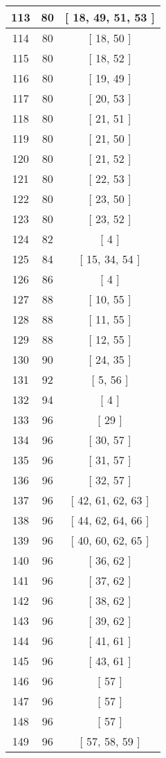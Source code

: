 \begin{center}
\begin{longtable}[H]{|| c c c ||}
113 & 80 & [ 18, 49, 51, 53 ]
\\\hline
114 & 80 & [ 18, 50 ]
\\\hline
115 & 80 & [ 18, 52 ]
\\\hline
116 & 80 & [ 19, 49 ]
\\\hline
117 & 80 & [ 20, 53 ]
\\\hline
118 & 80 & [ 21, 51 ]
\\\hline
119 & 80 & [ 21, 50 ]
\\\hline
120 & 80 & [ 21, 52 ]
\\\hline
121 & 80 & [ 22, 53 ]
\\\hline
122 & 80 & [ 23, 50 ]
\\\hline
123 & 80 & [ 23, 52 ]
\\\hline
124 & 82 & [ 4 ]
\\\hline
125 & 84 & [ 15, 34, 54 ]
\\\hline
126 & 86 & [ 4 ]
\\\hline
127 & 88 & [ 10, 55 ]
\\\hline
128 & 88 & [ 11, 55 ]
\\\hline
129 & 88 & [ 12, 55 ]
\\\hline
130 & 90 & [ 24, 35 ]
\\\hline
131 & 92 & [ 5, 56 ]
\\\hline
132 & 94 & [ 4 ]
\\\hline
133 & 96 & [ 29 ]
\\\hline
134 & 96 & [ 30, 57 ]
\\\hline
135 & 96 & [ 31, 57 ]
\\\hline
136 & 96 & [ 32, 57 ]
\\\hline
137 & 96 & [ 42, 61, 62, 63 ]
\\\hline
138 & 96 & [ 44, 62, 64, 66 ]
\\\hline
139 & 96 & [ 40, 60, 62, 65 ]
\\\hline
140 & 96 & [ 36, 62 ]
\\\hline
141 & 96 & [ 37, 62 ]
\\\hline
142 & 96 & [ 38, 62 ]
\\\hline
143 & 96 & [ 39, 62 ]
\\\hline
144 & 96 & [ 41, 61 ]
\\\hline
145 & 96 & [ 43, 61 ]
\\\hline
146 & 96 & [ 57 ]
\\\hline
147 & 96 & [ 57 ]
\\\hline
148 & 96 & [ 57 ]
\\\hline
149 & 96 & [ 57, 58, 59 ]
\\\hline

\end{longtable}
\end{center}

